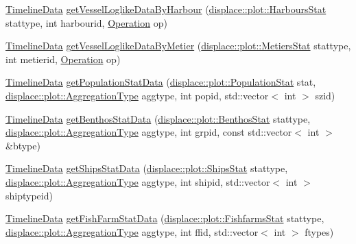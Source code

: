 \begin{DoxyCompactItemize}
\item 
\mbox{\hyperlink{struct_timeline_data}{Timeline\+Data}} \mbox{\hyperlink{class_s_q_lite_output_storage_a41abcf70b12fcc6762558afbec357f9e}{get\+Vessel\+Loglike\+Data\+By\+Harbour}} (\mbox{\hyperlink{namespacedisplace_1_1plot_a006fcde9bb7e602d977226ff75cb67aa}{displace\+::plot\+::\+Harbours\+Stat}} stattype, int harbourid, \mbox{\hyperlink{class_s_q_lite_output_storage_aa3928d8e7ab04aafef854a63a94222eb}{Operation}} op)
\item 
\mbox{\hyperlink{struct_timeline_data}{Timeline\+Data}} \mbox{\hyperlink{class_s_q_lite_output_storage_a4f84767e2d052a7566e5c24e09d9c0d6}{get\+Vessel\+Loglike\+Data\+By\+Metier}} (\mbox{\hyperlink{namespacedisplace_1_1plot_a673bbc813b7f03be3dc76ae7fd087516}{displace\+::plot\+::\+Metiers\+Stat}} stattype, int metierid, \mbox{\hyperlink{class_s_q_lite_output_storage_aa3928d8e7ab04aafef854a63a94222eb}{Operation}} op)
\item 
\mbox{\hyperlink{struct_timeline_data}{Timeline\+Data}} \mbox{\hyperlink{class_s_q_lite_output_storage_a6b3820c96847dff0982b7f075312b2d7}{get\+Population\+Stat\+Data}} (\mbox{\hyperlink{namespacedisplace_1_1plot_a523612c6239ff69acc3e5b7c5b40b618}{displace\+::plot\+::\+Population\+Stat}} stat, \mbox{\hyperlink{namespacedisplace_1_1plot_a522cdc3da3faefae0803944b866e0c3d}{displace\+::plot\+::\+Aggregation\+Type}} aggtype, int popid, std\+::vector$<$ int $>$ szid)
\item 
\mbox{\hyperlink{struct_timeline_data}{Timeline\+Data}} \mbox{\hyperlink{class_s_q_lite_output_storage_aea0e285a8d0b0e3fc9ed095d8daef966}{get\+Benthos\+Stat\+Data}} (\mbox{\hyperlink{namespacedisplace_1_1plot_a3a91ceda6f3e5855d0e7cf97e8dea045}{displace\+::plot\+::\+Benthos\+Stat}} stattype, \mbox{\hyperlink{namespacedisplace_1_1plot_a522cdc3da3faefae0803944b866e0c3d}{displace\+::plot\+::\+Aggregation\+Type}} aggtype, int grpid, const std\+::vector$<$ int $>$ \&btype)
\item 
\mbox{\hyperlink{struct_timeline_data}{Timeline\+Data}} \mbox{\hyperlink{class_s_q_lite_output_storage_ade2be014ca467951f61fd6e11b6bcb85}{get\+Ships\+Stat\+Data}} (\mbox{\hyperlink{namespacedisplace_1_1plot_a8c50b4d54cafba744b1b5b51b53407e0}{displace\+::plot\+::\+Ships\+Stat}} stattype, \mbox{\hyperlink{namespacedisplace_1_1plot_a522cdc3da3faefae0803944b866e0c3d}{displace\+::plot\+::\+Aggregation\+Type}} aggtype, int shipid, std\+::vector$<$ int $>$ shiptypeid)
\item 
\mbox{\hyperlink{struct_timeline_data}{Timeline\+Data}} \mbox{\hyperlink{class_s_q_lite_output_storage_a9fcb77eceee6c2ba83d5cba617ad652c}{get\+Fish\+Farm\+Stat\+Data}} (\mbox{\hyperlink{namespacedisplace_1_1plot_a4746af73ffe0625cf87b8fb07fd5bfa4}{displace\+::plot\+::\+Fishfarms\+Stat}} stattype, \mbox{\hyperlink{namespacedisplace_1_1plot_a522cdc3da3faefae0803944b866e0c3d}{displace\+::plot\+::\+Aggregation\+Type}} aggtype, int ffid, std\+::vector$<$ int $>$ ftypes)

\end{DoxyCompactItemize}
